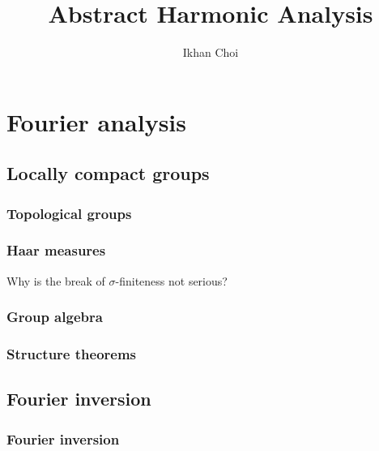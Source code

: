\documentclass{../note}
\begin{document}
\title{Abstract Harmonic Analysis}
\author{Ikhan Choi}
\maketitle
\tableofcontents



\part{Fourier analysis}
\chapter{Locally compact groups}
\section{Topological groups}
\section{Haar measures}
\begin{prb}
\end{prb}
Why is the break of $\sigma$-finiteness not serious?
\section{Group algebra}
\begin{prb}
\end{prb}
\begin{prb}[Convolution]
\end{prb}
\section{Structure theorems}


\chapter{Fourier inversion}
\section{Fourier inversion}
\begin{prb}
\end{prb}
\begin{prb}
\end{prb}
\begin{prb}
\end{prb}
\begin{prb}
\end{prb}
\end{document}
